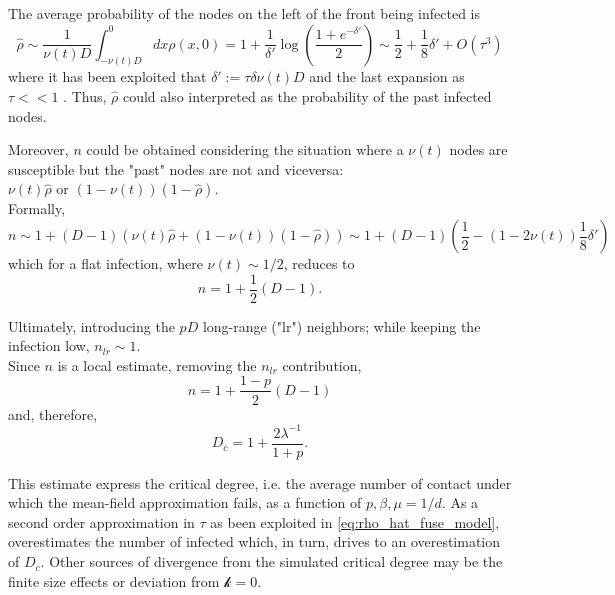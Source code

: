 \documentclass[a4paper,10pt,twoside]{book} %
\theoremstyle{definition}
\begin{document}
The average probability of the nodes on the left of the front being infected is
\begin{equation}
	\hat{\rho} \sim \frac{1}{\nu(t) D} \int_{-\nu(t) D}^{0} dx \rho(x,0) = 1+ \frac{1}{\delta'} \log( \frac{1+e^{-\delta'}}{2} )
	\sim \frac{1}{2} + \frac{1}{8} \delta' + O(\tau^3) 
	\label{eq:rho_hat_fuse_model}
\end{equation}
where it has been exploited that $\delta':=\tau \delta \nu(t) D$ and the last expansion as $\tau<<1$ \cite{Thurner::Appendix_NetBasedExpl}. Thus, $\hat{\rho}$ could also interpreted as the probability of the past infected nodes.

Moreover, $n$ could be obtained considering the situation where a $\nu(t)$ nodes are susceptible but the "past" nodes are not and viceversa: $\nu(t) \hat{\rho} \text{ or } (1-\nu(t))(1- \hat{\rho})$. 
\\Formally,
\begin{equation}
	n \sim 1+ (D-1)(\nu(t)\hat{\rho}+(1-\nu(t))(1-\hat{\rho}))
	\sim 1+ (D-1)(\frac{1}{2} - (1-2\nu(t)) \frac{1}{8} \delta')
\end{equation}
which for a flat infection, where $\nu(t)\sim 1/2$, reduces to
\begin{equation}
	n = 1 + \frac{1}{2}(D-1).
\end{equation} 

Ultimately, introducing the $pD$ long-range ("lr") neighbors; while keeping the infection low, $n_{lr} \sim 1$.
\\Since $n$ is a local estimate, removing the $n_{lr}$ contribution,
\begin{equation}
	n = 1 + \frac{1-p}{2}(D-1)
\end{equation}   
and, therefore,
\begin{equation}
	D_c = 1+ \frac{2 \lambda^{-1}}{1+p}.
	\label{eq:final_D_c_fuse_network}
\end{equation}

This estimate express the critical degree, i.e. the average number of contact under which the mean-field approximation fails, as a function of $p,\beta,\mu = 1/d$. As a second order approximation in $\tau$ as been exploited in \autoref{eq:rho_hat_fuse_model}, overestimates the number of infected which, in turn, drives to an overestimation of $D_c$. Other sources of divergence from the simulated critical degree may be the finite size effects or deviation from $\mathcal{k} = 0$.
\end{document}
